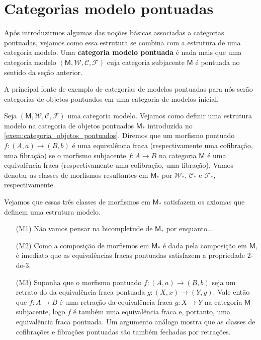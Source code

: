 \section{Categorias modelo pontuadas}

Após introduzirmos algumas das noções básicas associadas a categorias pontuadas, vejamos como essa estrutura se combina com a estrutura de uma categoria modelo.
Uma \textbf{categoria modelo pontuada} é nada mais que uma categoria modelo $(\mathsf{M},\mathcal{W},\mathcal{C},\mathcal{F})$ cuja categoria subjacente $\mathsf{M}$ é pontuada no sentido da seção anterior.

A principal fonte de exemplo de categorias de modelos pontuadas para nós serão categorias de objetos pontuados em uma categoria de modelos inicial.

\begin{exem}\label{exem:estrutura_modelo_objetos_pontuados}
  Seja $(\mathsf{M},\mathcal{W},\mathcal{C},\mathcal{F})$ uma categoria modelo.
  Vejamos como definir uma estrutura modelo na categoria de objetos pontuados $\mathsf{M_{*}}$ introduzida no \cref{exem:categoria_objetos_pontuados}.
  Diremos que um morfismo pontuado $f: (A,a) \to (B,b)$ é uma equivalência fraca (respectivamente uma cofibração, uma fibração) se o morfismo subjacente $f: A \to B$ na categoria $\mathsf{M}$ é uma equivalência fraca (respectivamente uma cofibração, uma fibração).
  Vamos denotar as classes de morfismos resultantes em $\mathsf{M}_{*}$ por $\mathcal{W}_{*}$, $\mathcal{C}_{*}$ e $\mathcal{F}_{*}$, respectivamente.

  Vejamos que essas três classes de morfismos em $\mathsf{M}_{*}$ satisfazem os axiomas que definem uma estrutura modelo.
  \begin{enumerate}
  \item[(M1)] Não vamos pensar na bicompletude de $\mathsf{M}_{*}$ por enquanto...
    
  \item[(M2)] Como a composição de morfismos em $\mathsf{M}_{*}$ é dada pela composição em $\mathsf{M}$, é imediato que as equivalências fracas pontuadas satisfazem a propriedade 2-de-3.
    
  \item[(M3)] Suponha que o morfismo pontuado $f: (A,a) \to (B,b)$ seja um retrato do da equivalência fraca pontuada $g: (X,x) \to (Y,y)$.
    Vale então que $f: A \to B$ é uma retração da equivalência fraca $g: X \to Y$ na categoria $\mathsf{M}$ subjacente, logo $f$ é também uma equivalência fraca e, portanto, uma equivalência fraca pontuada.
    Um argumento análogo mostra que as classes de cofibrações e fibrações pontuadas são também fechadas por retrações.
    

\end{enumerate}
\end{exem}
